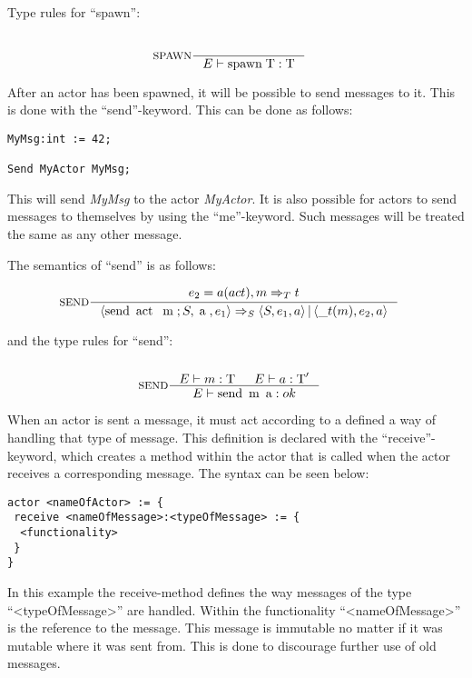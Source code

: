 Type rules for \enquote{spawn}:

\begin{align*}
\intertext{}
&\inference[SPAWN]{}
                 {\Tenv \mathbin{\text{spawn}} \; \Tt: \Tt}
\end{align*}

After an actor has been spawned, it will be possible to send messages to it. This is done with the \enquote{send}-keyword. This can be done as follows:

\label{actorfuncSend}
\begin{lstlisting}
MyMsg:int := 42;

Send MyActor MyMsg;
\end{lstlisting}

This will send \emph{MyMsg} to the actor \emph{MyActor}.
It is also possible for actors to send messages to themselves by using the \enquote{me}-keyword. Such messages will be treated the same as any other message.

The semantics of \enquote{send} is as follows:

\begin{align*}
&\inference[$\text{SEND}$]{e_2 = a(act),m \Rightarrow_T t}
                       {\Braket{\Tsend \Tact \Tm ; S,\Ta,e_1} \Rightarrow_S \Braket{S,e_1,a}|\Braket{\_t(m),e_2,a}}
\end{align*}

and the type rules for \enquote{send}:

\begin{align*}
\intertext{}
&\inference[SEND]{\Tenv m : \Tt & \Tenv a: \Tt'}
                 {\Tenv \mathbin{\text{send}} \; \mathbin{\text{m}} \; \mathbin{\text{a}} : ok }
\end{align*}

When an actor is sent a message, it must act according to a defined a way of handling that type of message. This definition is declared with the \enquote{receive}-keyword, which creates a method within the actor that is called when the actor receives a corresponding message. The syntax can be seen below:

\label{actorfuncReceive}
\begin{lstlisting}
actor <nameOfActor> := {
 receive <nameOfMessage>:<typeOfMessage> := {
  <functionality>
 }
}
\end{lstlisting}

In this example the receive-method defines the way messages of the type \enquote{<typeOfMessage>} are handled. Within the functionality \enquote{<nameOfMessage>} is the reference to the message. This message is immutable no matter if it was mutable where it was sent from. This is done to discourage further use of old messages.

